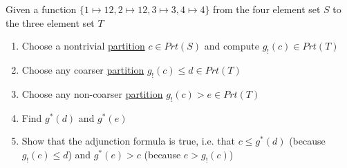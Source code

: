 
Given a function $\{1 \mapsto 12, 2 \mapsto 12, 3 \mapsto 3, 4 \mapsto 4\}$ from the four element set $S$ to the three element set $T$
    \begin{enumerate}
      \item Choose a nontrivial \href{doc/1 math/Seven Sketches in Compositionality/Chapter 1: Generative Effects/2 What is order/Partition}{partition} $c \in Prt(S)$ and compute $g_!(c) \in Prt(T)$
      \item Choose any coarser \href{doc/1 math/Seven Sketches in Compositionality/Chapter 1: Generative Effects/2 What is order/Partition}{partition} $g_!(c)\leq d \in Prt(T)$
      \item Choose any non-coarser \href{doc/1 math/Seven Sketches in Compositionality/Chapter 1: Generative Effects/2 What is order/Partition}{partition} $g_!(c) > e \in Prt(T)$
      \item Find $g^*(d)$ and $g^*(e)$
      \item Show that the adjunction formula is true, i.e. that $c \leq g^*(d)$ (because $g_!(c) \leq d$) and $g^*(e) > c$ (because $e > g_!(c)$)
    \end{enumerate}